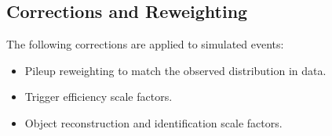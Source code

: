 \subsection{Corrections and Reweighting}
\label{sec:data_mc:corrections}


The following corrections are applied to simulated events:
\begin{itemize}
  \item Pileup reweighting to match the observed distribution in data.
  \item Trigger efficiency scale factors.
  \item Object reconstruction and identification scale factors.
\end{itemize}
